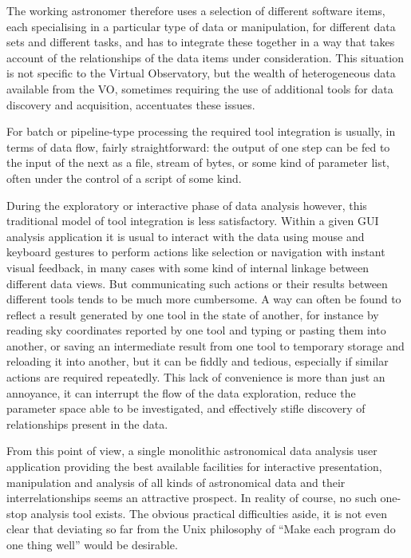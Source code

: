 \documentclass[5p]{elsarticle}
\begin{document}
The working astronomer therefore uses a selection
of different software items,
each specialising in a particular type of data or manipulation,
for different data sets and different tasks,
and has to integrate these together in a way that takes account of
the relationships of the data items under consideration.
This situation is not specific to the Virtual Observatory,
but the wealth of heterogeneous data available from the VO,
sometimes requiring the use of additional tools for data discovery
and acquisition, accentuates these issues.

For batch or pipeline-type processing the required tool integration
is usually, in terms of data flow, fairly straightforward:
the output of one step can be fed to the input of the next as a file,
stream of bytes, or some kind of parameter list,
often under the control of a script of some kind.

During the exploratory or interactive phase of data analysis however,
this traditional model of tool integration is less satisfactory.
Within a given GUI analysis application
it is usual to interact with the data using
mouse and keyboard gestures to perform actions like selection or
navigation with instant visual feedback, in many cases with some
kind of internal linkage between different data views.
But communicating such actions or their results between different
tools tends to be much more cumbersome.
A way can often be found to reflect a result generated by one tool
in the state of another, for instance by reading sky coordinates
reported by one tool and typing or pasting them into another,
or saving an intermediate result from one tool to temporary storage
and reloading it into another, but it can be fiddly and tedious,
especially if similar actions are required repeatedly.
This lack of convenience is more than just an annoyance, it can
interrupt the flow of the data exploration, reduce the parameter
space able to be investigated, and effectively stifle discovery
of relationships present in the data.

From this point of view, a single monolithic astronomical data analysis
user application providing the best available facilities for
interactive presentation, manipulation and analysis of all kinds of
astronomical data and their interrelationships seems an attractive prospect.
In reality of course, no such one-stop analysis tool exists.
The obvious practical difficulties aside, it is not even clear
that deviating so far from the Unix philosophy of
``Make each program do one thing well'' \citep{mcilroy1978}
would be desirable.
\end{document}

